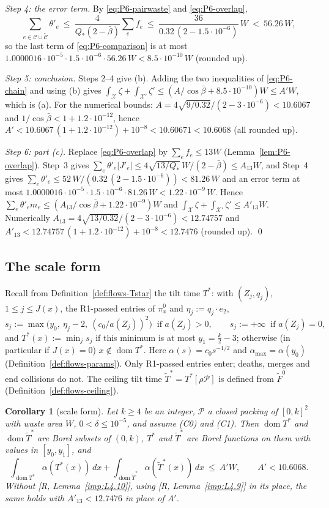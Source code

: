 \documentclass[11pt]{amsart}
\newcommand{\cP}{\mathcal P}
\newcommand{\cX}{\mathcal X}
\newcommand{\amax}{\alpha_{\max}}
\newcommand{\bbar}{\bar\beta}
\newcommand{\Tstar}{T^{*}}
\newtheorem{corollary}[theorem]{Corollary}
\theoremstyle{definition}
\theoremstyle{remark}
\numberwithin{equation}{section}
\begin{document}
\emph{Step 4: the error term.} By \eqref{eq:P6-pairwaste} and \eqref{eq:P6-overlap},
\[
\sum_{e\in\mathcal C\cup\tilde{\mathcal C}}\theta'_e\ \le\ \frac{4}{Q_*(2-\bbar)}\sum_ef_e\ \le\ \frac{36}{0.32\,(2-1.5\cdot10^{-6})}\,W\ <\ 56.26\,W ,
\]
so the last term of \eqref{eq:P6-comparison} is at most
$1.0000016\cdot10^{-5}\cdot1.5\cdot10^{-6}\cdot56.26\,W<8.5\cdot10^{-10}\,W$ (rounded up).

\emph{Step 5: conclusion.} Steps 2--4 give (b). Adding the two inequalities of \eqref{eq:P6-chain} and using (b)
gives $\int_{\cX}\zeta+\int_{\cX'}\zeta'\le(A/\cos\bbar+8.5\cdot10^{-10})W\le A'W$, which is (a). For the numerical
bounds: $A=4\sqrt{9/0.32}/(2-3\cdot10^{-6})<10.6067$ and $1/\cos\bbar<1+1.2\cdot10^{-12}$, hence
$A'<10.6067\,(1+1.2\cdot10^{-12})+10^{-8}<10.60671<10.6068$ (all rounded up).

\emph{Step 6: part (c).} Replace \eqref{eq:P6-overlap} by $\sum_ef_e\le13W$ (Lemma~\ref{lem:P6-overlap}). Step~3
gives $\sum_e\theta'_e|J'_e|\le4\sqrt{13/Q_*}\,W/(2-\bbar)\le A_{13}W$, and Step~4 gives
$\sum_e\theta'_e\le52\,W/(0.32\,(2-1.5\cdot10^{-6}))<81.26\,W$ and an error term at most
$1.0000016\cdot10^{-5}\cdot1.5\cdot10^{-6}\cdot81.26\,W<1.22\cdot10^{-9}\,W$. Hence
$\sum_e\theta'_em_e\le(A_{13}/\cos\bbar+1.22\cdot10^{-9})W$ and $\int_{\cX}\zeta+\int_{\cX'}\zeta'\le A'_{13}W$.
Numerically $A_{13}=4\sqrt{13/0.32}/(2-3\cdot10^{-6})<12.74757$ and
$A'_{13}<12.74757\,(1+1.2\cdot10^{-12})+10^{-8}<12.7476$ (rounded up). \qed

\subsection{The scale form}\label{ssec:P6-scale}

Recall from Definition~\ref{def:flows-Tstar} the tilt time $\Tstar$: with $(Z_j,q_j)$, $1\le j\le J(x)$, the
R1-passed entries of $\pi^0_x$ and $\eta_j:=q_j\cdot e_2$,
\[
s_j:=\max\big(y_0,\ \eta_j-2,\ (c_0/a(Z_j))^2\big)\ \text{ if } a(Z_j)>0,\qquad s_j:=+\infty\ \text{ if } a(Z_j)=0,
\]
and $\Tstar(x):=\min_js_j$ if this minimum is at most $y_1=\frac k2-3$; otherwise (in particular if $J(x)=0$)
$x\notin\operatorname{dom}\Tstar$. Here $\alpha(s)=c_0s^{-1/2}$ and $\amax=\alpha(y_0)$
(Definition~\ref{def:flows-params}). Only R1-passed entries enter; deaths, merges and end collisions do not. The
ceiling tilt time $\tilde T^*=\Tstar[\rho\cP]$ is defined from $\tilde F^0$ (Definition~\ref{def:flows-ceiling}).

\begin{corollary}[scale form]\label{cor:P6scale}
Let $k\ge4$ be an integer, $\cP$ a closed packing of $[0,k]^2$ with waste area $W$, $0<\delta\le10^{-5}$, and assume
\textup{(C0)} and \textup{(C1)}. Then $\operatorname{dom}\Tstar$ and $\operatorname{dom}\tilde T^*$ are Borel subsets of
$(0,k)$, $\Tstar$ and $\tilde T^*$ are Borel functions on them with values in $[y_0,y_1]$, and
\[
\int_{\operatorname{dom}\Tstar}\alpha(\Tstar(x))\,dx+\int_{\operatorname{dom}\tilde T^*}\alpha(\tilde T^*(x))\,dx\ \le\ A'W,
\qquad A'<10.6068 .
\]
Without [R, Lemma~\ref{imp:L4.10}], using [R, Lemma~\ref{imp:L4.9}] in its place, the same holds with $A'_{13}<12.7476$
in place of $A'$.
\end{corollary}
\end{document}
